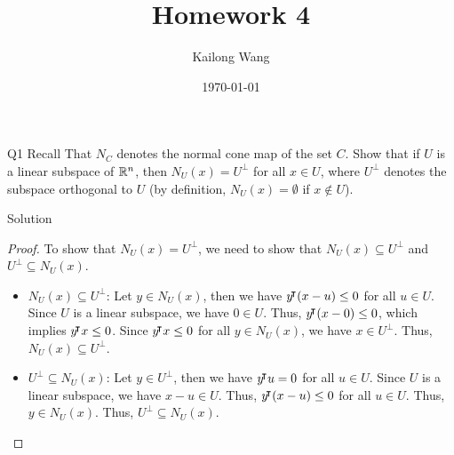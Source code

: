 \documentclass{article}
\title{Homework 4}
\author{Kailong Wang}
\date{\today}
\begin{document}
\maketitle

\begin{problem}
    {Q1}
    Recall That $N_C$ denotes the normal cone map of the set $C$. Show that if $U$ is a linear subspace of $\mathbb{R}^n$, then $N_U(x)=U^{\bot}$ for all $x\in U$, where $U^{\bot}$ denotes the subspace orthogonal to $U$ (by definition, $N_U(x)=\emptyset$ if $x\notin U$).
\end{problem}

\begin{solution}
    {Solution}
    \begin{proof}
        To show that $N_U(x)=U^{\bot}$, we need to show that $N_U(x)\subseteq U^{\bot}$ and $U^{\bot}\subseteq N_U(x)$.
        \begin{itemize}
            \item $N_U(x)\subseteq U^{\bot}$: {
                    Let $y\in N_U(x)$, then we have $y{}^{\mkern-4mu\intercal}(x-u)\leq 0$ for all $u\in U$. Since $U$ is a linear subspace, we have $0\in U$. Thus, $y{}^{\mkern-4mu\intercal}(x-0)\leq 0$, which implies $y{}^{\mkern-4mu\intercal} x\leq 0$. Since $y{}^{\mkern-4mu\intercal} x\leq 0$ for all $y\in N_U(x)$, we have $x\in U^{\bot}$. Thus, $N_U(x)\subseteq U^{\bot}$.
            }
            \item $U^{\bot}\subseteq N_U(x)$: {
                    Let $y\in U^{\bot}$, then we have $y{}^{\mkern-4mu\intercal} u=0$ for all $u\in U$. Since $U$ is a linear subspace, we have $x-u\in U$. Thus, $y{}^{\mkern-4mu\intercal}(x-u)\leq 0$ for all $u\in U$. Thus, $y\in N_U(x)$. Thus, $U^{\bot}\subseteq N_U(x)$.
            }
        \end{itemize}
    \end{proof}
\end{solution}
\end{document}
